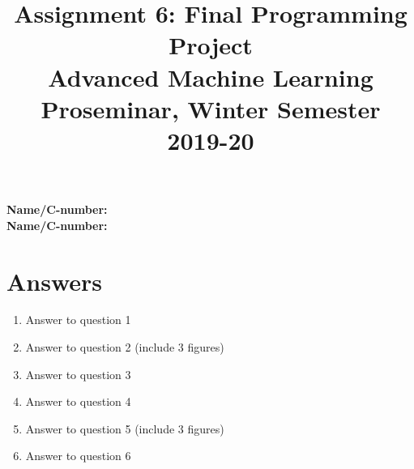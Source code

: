 \documentclass[11pt,a4paper]{article}
\title{\textbf{Assignment 6: Final Programming Project} \\ \Large Advanced Machine Learning Proseminar, Winter Semester 2019-20}
\date{}
\begin{document}
\maketitle

\vspace{-1cm}

\noindent
\textbf{Name/C-number:}  \\
\textbf{Name/C-number:}  \\

\section{Answers}

\begin{enumerate}
\item Answer to question 1
\item Answer to question 2 (include 3 figures)
\item Answer to question 3 
\item Answer to question 4
\item Answer to question 5 (include 3 figures)
\item Answer to question 6
\end{enumerate}
\end{document}
